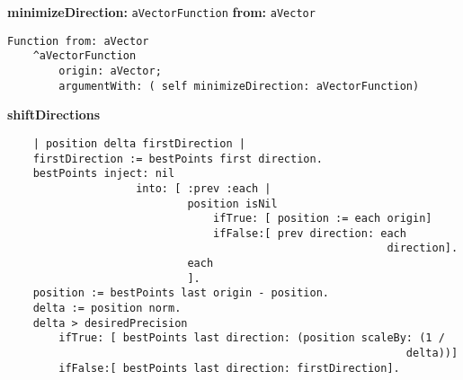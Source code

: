 {\bf minimizeDirection:} {\tt aVectorFunction} {\bf from:} {\tt aVector}
\begin{verbatim}
Function from: aVector
    ^aVectorFunction
        origin: aVector;
        argumentWith: ( self minimizeDirection: aVectorFunction)

\end{verbatim}
{\bf shiftDirections}
\begin{verbatim}
    | position delta firstDirection |
    firstDirection := bestPoints first direction.
    bestPoints inject: nil
                    into: [ :prev :each |
                            position isNil
                                ifTrue: [ position := each origin]
                                ifFalse:[ prev direction: each
                                                           direction].
                            each
                            ].
    position := bestPoints last origin - position.
    delta := position norm.
    delta > desiredPrecision
        ifTrue: [ bestPoints last direction: (position scaleBy: (1 /
                                                              delta))]
        ifFalse:[ bestPoints last direction: firstDirection].

\end{verbatim}
